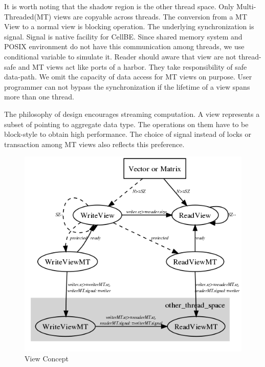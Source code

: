 \documentclass[a4paper, 11pt]{article}
\begin{document}
It is worth noting that the shadow region is the other thread space. Only Multi-Threaded(MT) views are copyable across threads. The conversion from a MT View to a normal view is blocking operation. The underlying synchronization is signal. Signal is native facility for CellBE. Since shared memory system and POSIX environment do not have this communication among threads, we use conditional variable to simulate it. Reader should aware that view are not thread-safe and MT views act like ports of a harbor. They take responsibility of safe data-path. We omit the capacity of data access for MT views on purpose. User programmer can not bypass the synchronization if the lifetime of a view spans more than one thread.

The philosophy of design encourages streaming computation. A view represents a subset of pointing to aggregate data type. The operations on them have to be block-style to obtain high performance. The choice of signal instead of locks or transaction among MT views also reflects this preference.
\begin{figure}
\includegraphics[width=\textwidth]{view_concept}
\caption{View Concept}
\label{vconcpt}
\end{figure}
\end{document}
